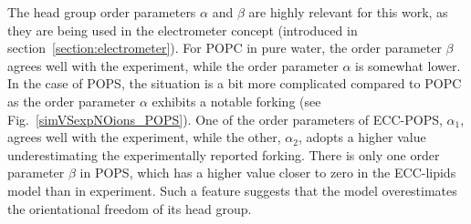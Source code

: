 \documentclass[12pt,a4paper,twoside,openright]{report}
\begin{document}
The head group order parameters $\alpha$ and $\beta$ are highly relevant for this work,
as they are being used in the electrometer concept (introduced in section~\ref{section:electrometer}). 
For POPC in pure water, the order parameter $\beta$ agrees well with the experiment, 
while the order parameter $\alpha$ is somewhat lower. 
In the case of POPS, the situation is a bit more complicated
compared to POPC as the order parameter $\alpha$ exhibits a notable forking (see Fig.~\ref{simVSexpNOions_POPS}).
One of the order parameters of ECC-POPS, $\alpha_1$, agrees well with the experiment, 
while the other, $\alpha_2$, adopts a higher value underestimating the experimentally reported forking. 
There is only one order parameter $\beta$ in POPS, 
which has a higher value closer to zero in the ECC-lipids model than in experiment. 
Such a feature suggests that the model overestimates the orientational freedom of its head group. 
 
\end{document}
